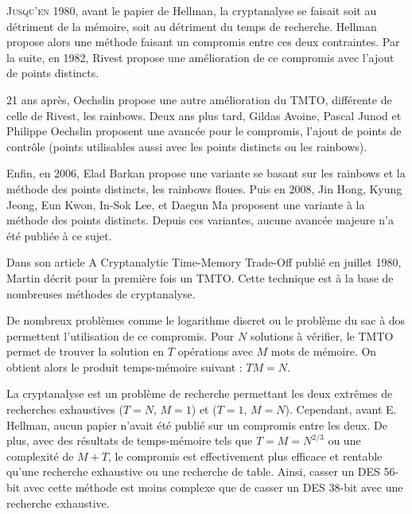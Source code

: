 

		\lettrine{J}{usqu'en 1980}, avant le papier de Hellman\cite{ehellman}, la cryptanalyse se faisait soit au détriment de la mémoire, soit au détriment du temps de recherche. Hellman propose alors une méthode faisant un compromis entre ces deux contraintes. Par la suite, en 1982, Rivest\cite{Rivest} propose une amélioration de ce compromis avec l'ajout de points distincts.

		\bigskip

		21 ans après, Oechslin\cite{Oech03} propose une autre amélioration du \gls{TMTO}, différente de celle de Rivest, les \glspl{rainbow}. Deux ans plus tard, Gildas Avoine, Pascal Junod et Philippe Oechslin\cite{checkpoints} proposent une avancée pour le compromis, l'ajout de points de contrôle (points utilisables aussi avec les points distincts ou les \glspl{rainbow}).

		\bigskip

		Enfin, en 2006, Elad Barkan propose une variante se basant sur les \glspl{rainbow} et la méthode des points distincts\cite{fuzzy}, les \glspl{rainbow} floues. Puis en 2008, Jin Hong, Kyung Jeong, Eun Kwon, In-Sok Lee, et Daegun Ma proposent une variante à la méthode des points distincts. Depuis ces variantes, aucune avancée majeure n'a été publiée à ce sujet.


		Dans son article \og{}A Cryptanalytic Time-Memory Trade-Off\fg{}\cite{ehellman} publié en juillet 1980, Martin  décrit pour la première fois un \gls{TMTO}. Cette technique est à la base de nombreuses méthodes de cryptanalyse.

		\bigskip

		De nombreux problèmes comme le logarithme discret ou le problème du sac à dos permettent l'utilisation de ce compromis. Pour $N$ solutions à vérifier, le \gls{TMTO} permet de trouver la solution en $T$ opérations avec $M$ mots de mémoire. On obtient alors le produit temps-mémoire suivant : $TM = N$.

		\bigskip

		La cryptanalyse est un problème de recherche permettant les deux extrêmes de recherches exhaustives ($T=N$, $M=1$) et ($T=1$, $M=N$). Cependant, avant E. Hellman\cite{ehellman}, aucun papier n'avait été publié sur un compromis entre les deux. De plus, avec des résultats de temps-mémoire tels que $T = M = N^{2/3}$ ou une complexité de $M + T$, le compromis est effectivement plus efficace et rentable qu'une recherche exhaustive ou une recherche de table. Ainsi, casser un DES 56-bit avec cette méthode est moins complexe que de casser un DES 38-bit avec une recherche exhaustive.

